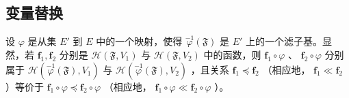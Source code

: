 \subsection{变量替换}

设 \(\varphi\) 是从集 \(E'\) 到 \(E\) 中的一个映射，使得 \(\overset{-1}{\varphi}(\mathfrak{F})\) 是 \(E'\) 上的一个滤子基。显然，若 \(\mathbf{f}_1, \mathbf{f}_2\) 分别是 \(\mathcal{H}(\mathfrak{F}, V_1)\) 与 \(\mathcal{H}(\mathfrak{F}, V_2)\) 中的函数，则 \(\mathbf{f}_1 \circ \varphi\) 、 \(\mathbf{f}_2 \circ \varphi\) 分别属于 \(\mathcal{H}(\overset{-1}{\varphi}(\mathfrak{F}), V_1)\) 与 \(\mathcal{H}(\overset{-1}{\varphi}(\mathfrak{F}), V_2)\) ，且关系 \(\mathbf{f}_1 \preccurlyeq \mathbf{f}_2\) （相应地， \(\mathbf{f}_1 \ll \mathbf{f}_2\) ）等价于 \(\mathbf{f}_1 \circ \varphi \preccurlyeq \mathbf{f}_2 \circ \varphi\) （相应地， \(\mathbf{f}_1 \circ \varphi \ll \mathbf{f}_2 \circ \varphi\) ）。

